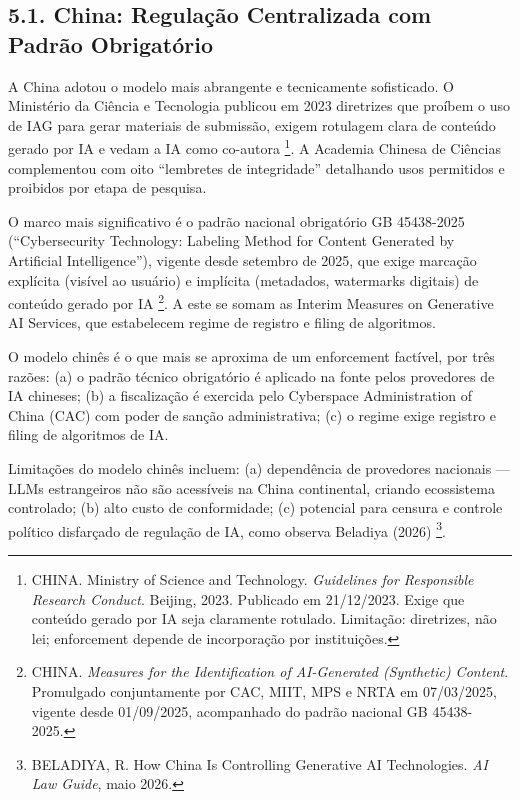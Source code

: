 \documentclass[
  12pt,
  a4paper,
  brazil,
  twoside
]{report}
\begin{document}
\subsection{5.1. China: Regulação Centralizada com Padrão
Obrigatório}\label{china-regulauxe7uxe3o-centralizada-com-padruxe3o-obrigatuxf3rio}

A China adotou o modelo mais abrangente e tecnicamente sofisticado. O
Ministério da Ciência e Tecnologia publicou em 2023 diretrizes que
proíbem o uso de IAG para gerar materiais de submissão, exigem rotulagem
clara de conteúdo gerado por IA e vedam a IA como co-autora \footnote{CHINA.
  Ministry of Science and Technology. \emph{Guidelines for Responsible
  Research Conduct}. Beijing, 2023. Publicado em 21/12/2023. Exige que
  conteúdo gerado por IA seja claramente rotulado. Limitação:
  diretrizes, não lei; enforcement depende de incorporação por
  instituições.}. A Academia Chinesa de Ciências complementou com oito
``lembretes de integridade'' detalhando usos permitidos e proibidos por
etapa de pesquisa.

O marco mais significativo é o padrão nacional obrigatório GB 45438-2025
(``Cybersecurity Technology: Labeling Method for Content Generated by
Artificial Intelligence''), vigente desde setembro de 2025, que exige
marcação explícita (visível ao usuário) e implícita (metadados,
watermarks digitais) de conteúdo gerado por IA \footnote{CHINA.
  \emph{Measures for the Identification of AI-Generated (Synthetic)
  Content}. Promulgado conjuntamente por CAC, MIIT, MPS e NRTA em
  07/03/2025, vigente desde 01/09/2025, acompanhado do padrão nacional
  GB 45438-2025.}. A este se somam as Interim Measures on Generative AI
Services, que estabelecem regime de registro e filing de algoritmos.

O modelo chinês é o que mais se aproxima de um enforcement factível, por
três razões: (a) o padrão técnico obrigatório é aplicado na fonte pelos
provedores de IA chineses; (b) a fiscalização é exercida pelo Cyberspace
Administration of China (CAC) com poder de sanção administrativa; (c) o
regime exige registro e filing de algoritmos de IA.

Limitações do modelo chinês incluem: (a) dependência de provedores
nacionais --- LLMs estrangeiros não são acessíveis na China continental,
criando ecossistema controlado; (b) alto custo de conformidade; (c)
potencial para censura e controle político disfarçado de regulação de
IA, como observa Beladiya (2026) \footnote{BELADIYA, R. How China Is
  Controlling Generative AI Technologies. \emph{AI Law Guide}, maio
  2026.}.
\end{document}
